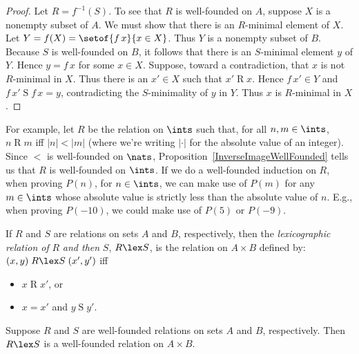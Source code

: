 \begin{proof}
Let $R=f^{-1}(S)$.  To see that $R$ is well-founded on $A$, suppose
$X$ is a nonempty subset of $A$.  We must show that there is an
$R$-minimal element of $X$.  Let $Y=f(X)=\setof{f\,x}{x\in X}$.
Thus $Y$ is a nonempty subset of $B$.  Because $S$ is well-founded
on $B$, it follows that there is an $S$-minimal element $y$ of $Y$.
Hence $y=f\,x$ for some $x\in X$.
Suppose, toward a contradiction, that $x$ is not $R$-minimal in $X$.
Thus there is an $x'\in X$ such that $x'\mathrel{R}x$.  Hence $f\,x'\in
Y$ and $f\,x'\mathrel{S}f\,x=y$, contradicting the $S$-minimality of
$y$ in $Y$.  Thus $x$ is $R$-minimal in $X$.
\end{proof}

For example, let $R$ be the relation on $\ints$ such that, for all
$n,m\in\ints$, $n\mathrel{R}m$ iff $|n|<|m|$ (where we're writing
$|\cdot|$ for the absolute value of an integer).  Since $<$ is
well-founded on $\nats$, Proposition~\ref{InverseImageWellFounded}
tells us that $R$ is well-founded on $\ints$.  If we do a well-founded
induction on $R$, when proving $P(n)$, for $n\in\ints$, we can make
use of $P(m)$ for any $m\in\ints$ whose absolute value is strictly
less than the absolute value of $n$.  E.g., when proving $P(-10)$, we
could make use of $P(5)$ or $P(-9)$.

If $R$ and $S$ are relations on
sets $A$ and $B$, respectively, then the \emph{lexicographic relation of}
%
%
%
%
$R$ \emph{and then} $S$, $R\lex S$, is the relation on $A\times B$ defined
by: $(x,y)\mathrel{R\lex S}(x',y')$ iff
\begin{itemize}
\item $x\mathrel{R}x'$, or

\item $x = x'$ and $y\mathrel{S}y'$.
\end{itemize}

\begin{proposition}
\label{LexWellFounded}
Suppose $R$ and $S$ are well-founded relations on sets $A$ and
$B$, respectively.  Then $R\lex S$ is a well-founded relation on
$A\times B$.  
\end{proposition}

